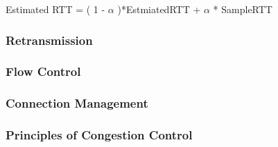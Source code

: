 \documentclass[11pt]{article}
\begin{document}
Estimated RTT = ( 1 - \(\alpha\) )*EstmiatedRTT + \(\alpha\) * SampleRTT

\subsubsection{Retransmission}
\label{sec:orgf3291e8}
\subsubsection{Flow Control}
\label{sec:orgec956ea}
\subsubsection{Connection Management}
\label{sec:org0a37350}
\subsubsection{Principles of Congestion Control}
\label{sec:orgdb5653b}
\end{document}
